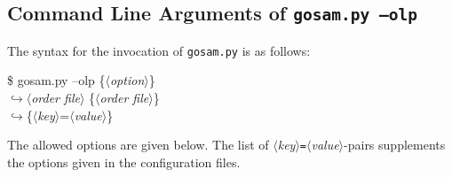 \documentclass[11pt,a4paper]{refrep}
\newcommand{\contl}{{\ensuremath{\hookrightarrow}}}
\begin{document}
\subsection{Command Line Arguments of \texttt{gosam.py --olp}}
The syntax for the invocation of \texttt{gosam.py} is as follows:
\begin{example}
\$ gosam.py --olp \{$\langle$\textit{option}$\rangle$\}\\
    \contl $\langle$\textit{order file}$\rangle$
    \{$\langle$\textit{order file}$\rangle$\} \\
    \contl \{$\langle$\textit{key}$\rangle$=$\langle$\textit{value}$\rangle$\}
\end{example}
The allowed options are given below. The list of
$\langle$\textit{key}$\rangle$\texttt{=}$\langle$\textit{value}$\rangle$-pairs
supplements the options given in the configuration files.
\end{document}
